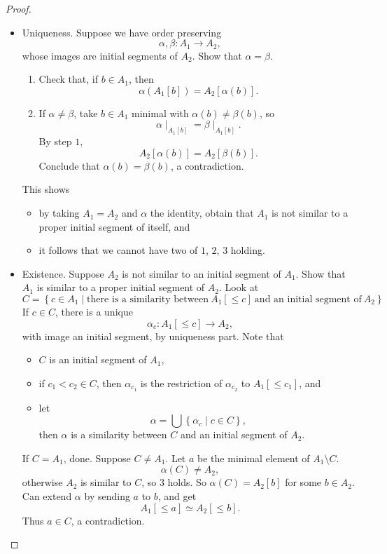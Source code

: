 \documentclass{article}
\newcommand{\rb}[1]{\left( #1 \right)}
\renewcommand{\sb}[1]{\left[ #1 \right]}
\newcommand{\cb}[1]{\left\{ #1 \right\}}
\theoremstyle{definition}\newtheorem{definition}{Definition}[subsection]
\theoremstyle{definition}\newtheorem{remark1}[definition]{Remark}
\theoremstyle{definition}\newtheorem{example1}[definition]{Example}
\theoremstyle{definition}\newtheorem*{remark2}{Remark}
\theoremstyle{definition}\newtheorem*{example2}{Example}
\theoremstyle{definition}\newtheorem*{note}{Note}
\theoremstyle{definition}\newtheorem*{notation}{Notation}
\begin{document}
\pagebreak

\begin{proof}
\hfill
\begin{itemize}
\item Uniqueness. Suppose we have order preserving
$$ \alpha, \beta : A_1 \to A_2, $$
whose images are initial segments of $ A_2 $. Show that $ \alpha = \beta $.
\begin{enumerate}[leftmargin=0.5in, label=Step \arabic*.]
\item Check that, if $ b \in A_1 $, then
$$ \alpha\rb{A_1\sb{b}} = A_2\sb{\alpha\rb{b}}. $$
\item If $ \alpha \ne \beta $, take $ b \in A_1 $ minimal with $ \alpha\rb{b} \ne \beta\rb{b} $, so
$$ \alpha \mid_{A_1\sb{b}} = \beta \mid_{A_1\sb{b}}. $$
By step $ 1 $,
$$ A_2\sb{\alpha\rb{b}} = A_2\sb{\beta\rb{b}}. $$
Conclude that $ \alpha\rb{b} = \beta\rb{b} $, a contradiction.
\end{enumerate}
This shows
\begin{itemize}
\item by taking $ A_1 = A_2 $ and $ \alpha $ the identity, obtain that $ A_1 $ is not similar to a proper initial segment of itself, and
\item it follows that we cannot have two of $ 1 $, $ 2 $, $ 3 $ holding.
\end{itemize}
\item Existence. Suppose $ A_2 $ is not similar to an initial segment of $ A_1 $. Show that $ A_1 $ is similar to a proper initial segment of $ A_2 $. Look at
$$ C = \cb{c \in A_1 \mid \text{there is a similarity between} \ A_1\sb{\le c} \ \text{and an initial segment of} \ A_2}. $$
If $ c \in C $, there is a unique
$$ \alpha_c : A_1\sb{\le c} \to A_2, $$
with image an initial segment, by uniqueness part. Note that
\begin{itemize}
\item $ C $ is an initial segment of $ A_1 $,
\item if $ c_1 < c_2 \in C $, then $ \alpha_{c_1} $ is the restriction of $ \alpha_{c_2} $ to $ A_1\sb{\le c_1} $, and
\item let
$$ \alpha = \bigcup \cb{\alpha_c \mid c \in C}, $$
then $ \alpha $ is a similarity between $ C $ and an initial segment of $ A_2 $.
\end{itemize}
If $ C = A_1 $, done. Suppose $ C \ne A_1 $. Let $ a $ be the minimal element of $ A_1 \setminus C $.
$$ \alpha\rb{C} \ne A_2, $$
otherwise $ A_2 $ is similar to $ C $, so $ 3 $ holds. So $ \alpha\rb{C} = A_2\sb{b} $ for some $ b \in A_2 $. Can extend $ \alpha $ by sending $ a $ to $ b $, and get
$$ A_1\sb{\le a} \simeq A_2\sb{\le b}. $$
Thus $ a \in C $, a contradiction.
\end{itemize}
\end{proof}
\end{document}
